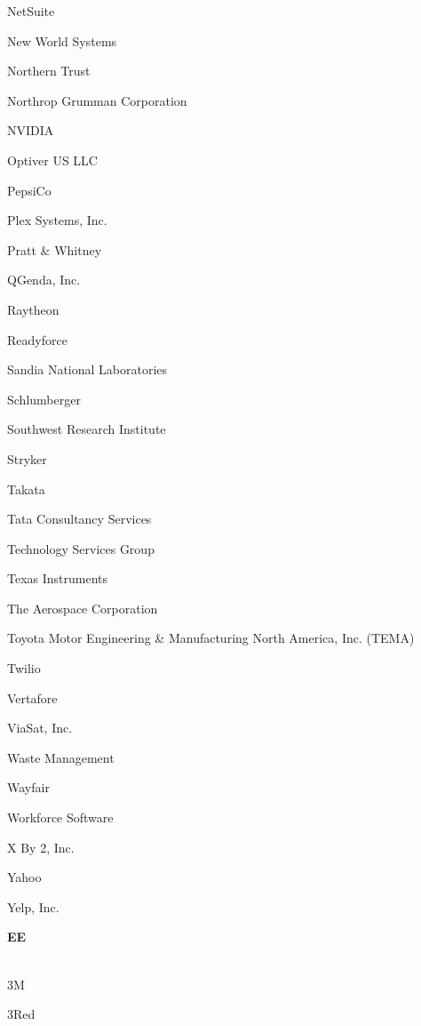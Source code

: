 \documentclass[twoside]{article}
\begin{document}
\begin{center}
\begin{multicols}{5}
\begin{FlushLeft}
\begin{compactitem}
\item NetSuite
\item New World Systems
\item Northern Trust
\item Northrop Grumman Corporation
\item NVIDIA
\item Optiver US LLC
\item PepsiCo
\item Plex Systems, Inc.
\item Pratt \& Whitney
\item QGenda, Inc.
\item Raytheon
\item Readyforce
\item Sandia National Laboratories
\item Schlumberger
\item Southwest Research Institute
\item Stryker
\item Takata
\item Tata Consultancy Services
\item Technology Services Group
\item Texas Instruments
\item The Aerospace Corporation
\item Toyota Motor Engineering \& Manufacturing North America, Inc. (TEMA)
\item Twilio
\item Vertafore
\item ViaSat, Inc.
\item Waste Management
\item Wayfair
\item Workforce Software
\item X By 2, Inc.
\item Yahoo
\item Yelp, Inc.
\end{compactitem}
        \end{FlushLeft}
        \vspace{1em}
        {\fontsize{14}{16}\selectfont \bf EE}\\
        \vspace{-1em}
        ~\hrulefill~
        \vspace{-.9em}
        \begin{FlushLeft}
        \begin{compactitem}
        \item 3M
\item 3Red

\end{compactitem}
\end{FlushLeft}
\end{multicols}
\end{center}
\end{document}
